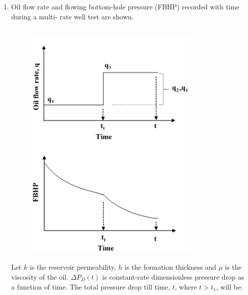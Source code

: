 \documentclass[12pt,a4paper]{article}
\begin{document}
\begin{enumerate}
\begin{enumerate}
\end{enumerate}

\item Oil flow rate and flowing bottom-hole pressure (FBHP) recorded with time during a multi-
rate well test are shown.\hfill{}\\\\

\begin{figure}[h!]
  \centering
  \includegraphics[width=0.5\columnwidth]{figs/pic10.png} 
\end{figure}



Let $k$ is the reservoir permeability, $h$ is the formation thickness and $\mu$ is the viscosity of the oil. $\Delta P_D(t)$ is constant-rate dimensionless pressure drop as a function of time. The total pressure drop till time, $t$, where $t > t_1$, will be: \hfill{}\begin{enumerate}
\end{enumerate}
\end{enumerate}
\end{document}
